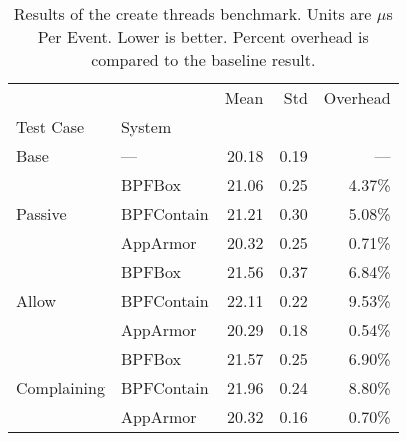 \begin{table}[htp!]
\centering
\footnotesize
\caption[Results of the create threads benchmark]{Results of the create threads benchmark. Units are $\mu$s Per Event. Lower is better. Percent overhead is compared to the baseline result.}
\label{tab:phoronix-create-threads}
\begin{tabular}{llrrr}
\toprule
            &          &   Mean &   Std & Overhead \\
Test Case & System &        &       &          \\
\midrule
Base & --- &  20.18 &  0.19 &      --- \\
\cline{1-5}
\multirow{3}{*}{Passive} & BPFBox &  21.06 &  0.25 &   4.37\% \\
            & BPFContain &  21.21 &  0.30 &   5.08\% \\
            & AppArmor &  20.32 &  0.25 &   0.71\% \\
\cline{1-5}
\multirow{3}{*}{Allow} & BPFBox &  21.56 &  0.37 &   6.84\% \\
            & BPFContain &  22.11 &  0.22 &   9.53\% \\
            & AppArmor &  20.29 &  0.18 &   0.54\% \\
\cline{1-5}
\multirow{3}{*}{Complaining} & BPFBox &  21.57 &  0.25 &   6.90\% \\
            & BPFContain &  21.96 &  0.24 &   8.80\% \\
            & AppArmor &  20.32 &  0.16 &   0.70\% \\
\bottomrule
\end{tabular}
\end{table}
